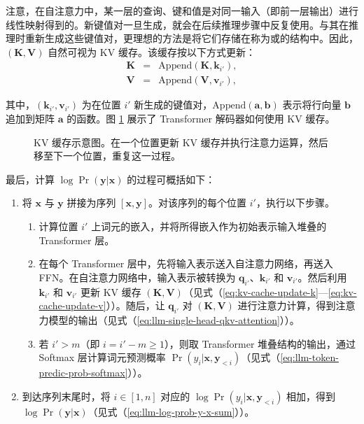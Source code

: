 注意，在自注意力中，某一层的查询、键和值是对同一输入（即前一层输出）进行线性映射得到的。新键值对一旦生成，就会在后续推理步骤中反复使用。与其在推理时重新生成这些键值对，更理想的方法是将它们存储在称为或的结构中。因此，$(\mathbf{K},\mathbf{V})$ 自然可视为 KV 缓存。该缓存按以下方式更新：
\begin{eqnarray}
\mathbf{K} & = & \mathrm{Append}(\mathbf{K}, \mathbf{k}_{i'}), \label{eq:kv-cache-update-k} \\
\mathbf{V} & = & \mathrm{Append}(\mathbf{V}, \mathbf{v}_{i'}), \label{eq:kv-cache-update-v}
\end{eqnarray}

\noindent 其中，$(\mathbf{k}_{i'}, \mathbf{v}_{i'})$ 为在位置 $i'$ 新生成的键值对，$\mathrm{Append}(\mathbf{a},\mathbf{b})$ 表示将行向量 $\mathbf{b}$ 追加到矩阵 $\mathbf{a}$ 的函数。图 \ref{fig:kv-cache-llm} 展示了 Transformer 解码器如何使用 KV 缓存。

\begin{figure}[!t]
\centering

\caption{KV 缓存示意图。在一个位置更新 KV 缓存并执行注意力运算，然后移至下一个位置，重复这一过程。}
\label{fig:kv-cache-llm}
\end{figure}

最后，计算 $\log \Pr(\mathbf{y}|\mathbf{x})$ 的过程可概括如下：

\begin{enumerate}
\item \vspace{0.5em} 将 $\mathbf{x}$ 与 $\mathbf{y}$ 拼接为序列 $[\mathbf{x},\mathbf{y}]$。对该序列的每个位置 $i'$，执行以下步骤。
\begin{enumerate}
\item \vspace{0.3em} 计算位置 $i'$ 上词元的嵌入，并将所得嵌入作为初始表示输入堆叠的 Transformer 层。
\item \vspace{0.3em} 在每个 Transformer 层中，先将输入表示送入自注意力网络，再送入 FFN。在自注意力网络中，输入表示被转换为 $\mathbf{q}_{i'}$、$\mathbf{k}_{i'}$ 和 $\mathbf{v}_{i'}$。然后利用 $\mathbf{k}_{i'}$ 和 $\mathbf{v}_{i'}$ 更新 KV 缓存 $(\mathbf{K},\mathbf{V})$（见式（\ref{eq:kv-cache-update-k}—\ref{eq:kv-cache-update-v}））。随后，让 $\mathbf{q}_{i'}$ 对 $(\mathbf{K},\mathbf{V})$ 进行注意力计算，得到注意力模型的输出（见式（\ref{eq:llm-single-head-qkv-attention}））。
\item 若 $i' > m$（即 $i = i' - m \ge 1$），则取 Transformer 堆叠结构的输出，通过 Softmax 层计算词元预测概率 $\Pr(y_i|\mathbf{x},\mathbf{y}_{<i})$（见式（\ref{eq:llm-token-predic-prob-softmax}））。
\end{enumerate}
\item 到达序列末尾时，将 $i \in [1,n]$ 对应的 $\log \Pr(y_i|\mathbf{x},\mathbf{y}_{<i})$ 相加，得到 $\log \Pr(\mathbf{y}|\mathbf{x})$（见式（\ref{eq:llm-log-prob-y-x-sum}））。
\end{enumerate}
\vspace{0.5em}

